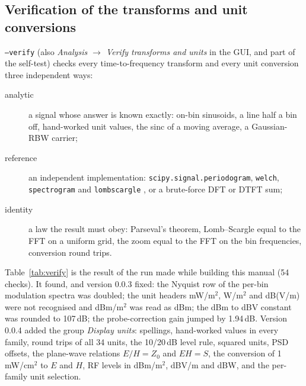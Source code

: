\documentclass[10pt,letterpaper]{article}
\numberwithin{equation}{section}
\begin{document}
\subsection{Verification of the transforms and unit conversions}\label{sec:verify_table}
\texttt{--verify} (also \emph{Analysis $\rightarrow$ Verify transforms and units} in
the GUI, and part of the self-test) checks every time-to-frequency transform and
every unit conversion three independent ways:
\begin{description}
\item[analytic] a signal whose answer is known exactly: on-bin sinusoids, a line
half a bin off, hand-worked unit values, the sinc of a moving average, a
Gaussian-RBW carrier;
\item[reference] an independent implementation: \texttt{scipy.signal.periodogram},
\texttt{welch}, \texttt{spectrogram} and \texttt{lombscargle} \cite{R10}, or a
brute-force DFT or DTFT sum;
\item[identity] a law the result must obey: Parseval's theorem, Lomb--Scargle
equal to the FFT on a uniform grid, the zoom equal to the FFT on the bin
frequencies, conversion round trips.
\end{description}
Table~\ref{tab:verify} is the result of the run made while building this manual
(54 checks). It found, and version 0.0.3 fixed: the Nyquist row of the
per-bin modulation spectra was doubled; the unit headers mW/m$^2$, \textmu W/m$^2$
and dB(\textmu V/m) were not recognised and dBm/m$^2$ was read as dBm; the dBm to
dB\textmu V constant was rounded to 107\,dB; the probe-correction gain jumped by
1.94\,dB. Version 0.0.4 added the group \emph{Display units}: spellings, hand-worked
values in every family, round trips of all 34 units, the 10/20\,dB level
rule, squared units, PSD offsets, the plane-wave relations $E/H = Z_0$ and
$E H = S$, the conversion of 1\,mW/cm$^2$ to $E$ and $H$, RF levels in dBm/m$^2$,
dB\textmu V/m and dBW, and the per-family unit selection.
\end{document}

